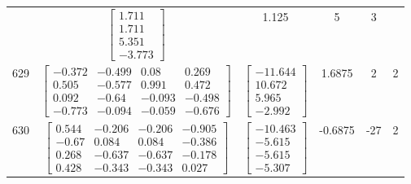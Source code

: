 \documentclass[a4paper,12pt]{article}
\begin{document}
\begin{tabular}{c c c c c c}
&
$\begin{bmatrix} 1.711 \\ 1.711 \\ 5.351 \\ -3.773 \end{bmatrix}$
&
1.125
&
5
&
3
\\
629
&
$\begin{bmatrix} -0.372 & -0.499 & 0.08 & 0.269 \\ 0.505 & -0.577 & 0.991 & 0.472 \\ 0.092 & -0.64 & -0.093 & -0.498 \\ -0.773 & -0.094 & -0.059 & -0.676 \end{bmatrix}$
&
$\begin{bmatrix} -11.644 \\ 10.672 \\ 5.965 \\ -2.992 \end{bmatrix}$
&
1.6875
&
2
&
2
\\
630
&
$\begin{bmatrix} 0.544 & -0.206 & -0.206 & -0.905 \\ -0.67 & 0.084 & 0.084 & -0.386 \\ 0.268 & -0.637 & -0.637 & -0.178 \\ 0.428 & -0.343 & -0.343 & 0.027 \end{bmatrix}$
&
$\begin{bmatrix} -10.463 \\ -5.615 \\ -5.615 \\ -5.307 \end{bmatrix}$
&
-0.6875
&
-27
&
2
\\
\end{tabular} \egroup \newpage
\end{document}
